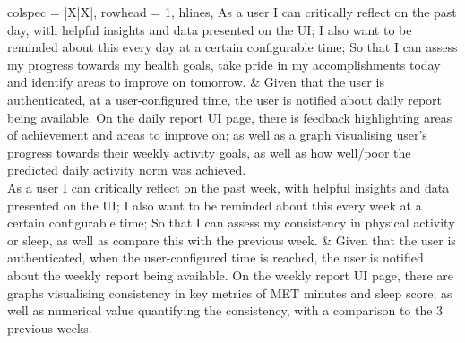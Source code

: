 \begin{center}
\begin{longtblr}[
            caption={User Stories},
            label={table:userStories}
        ] {
            colspec = {|X|X|},
            rowhead = 1,
            hlines,
        }
        As a user I can critically reflect on the past day, with helpful insights and data presented on the UI; I also want to be reminded about this every day at a certain configurable time; So that I can assess my progress towards my health goals, take pride in my accomplishments today and identify areas to improve on tomorrow.
        & 
        Given that the user is authenticated, at a user-configured time, the user is notified about daily report being available. On the daily report UI page, there is feedback highlighting areas of achievement and areas to improve on; as well as a graph visualising user's progress towards their weekly activity goals, as well as how well/poor the predicted daily activity norm was achieved.
        \\

        As a user I can critically reflect on the past week, with helpful insights and data presented on the UI; I also want to be reminded about this every week at a certain configurable time; So that I can assess my consistency in physical activity or sleep, as well as compare this with the previous week.
        &
        Given that the user is authenticated, when the user-configured time is reached, the user is notified about the weekly report being available. On the weekly report UI page, there are graphs visualising consistency in key metrics of MET minutes and sleep score; as well as numerical value quantifying the consistency, with a comparison to the 3 previous weeks. 
       \\


\end{longtblr}
\end{center}
